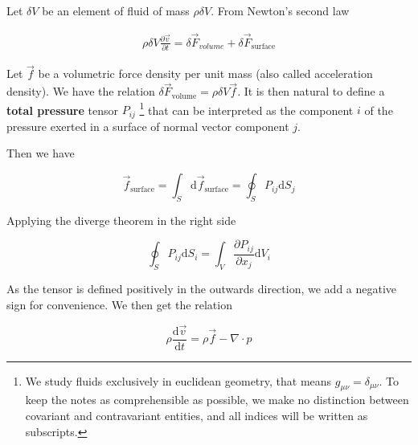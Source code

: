 \documentclass{article}
\begin{document}
Let $\delta V$ be an element of fluid of mass $\rho \delta V$. From Newton's
second law

\begin{eqnarray*}
  \rho \delta V \frac{\partial \vec{v}}{\partial t}=\delta \vec{F}_{v o l u m e}+\delta \vec{F}_{\text {surface}} 
\end{eqnarray*}

Let $\vec{f}$ be a volumetric force density per unit mass (also called
acceleration density). We have the relation $\delta \vec{F}_{\text{volume}} =
\rho \delta V \vec{f}$. It is then natural to define a \textbf{total pressure}
tensor $P_{ij}$ \footnote{We study fluids exclusively in euclidean geometry,
  that means $g_{\mu \nu} = \delta_{\mu \nu}$. To keep the notes as
  comprehensible as possible, we make no distinction between covariant and
  contravariant entities, and all indices will be written as subscripts.} that can be interpreted as the component $i$ of the pressure
exerted in a surface of normal vector component $j$.

\begin{center}
\end{center}

Then we have

\begin{equation*}
  \vec{f}_{\text {surface}}=\int_{S} \mathrm{d} \vec{f}_{\text {surface}}=\oint_{S} P_{i j} \mathrm{d} S_{j}
\end{equation*}

Applying the diverge theorem in the right side

\begin{equation*}
  \oint_{S} P_{i j} \mathrm{d} S_{i}=\int_{V} \frac{\partial P_{i j}}{\partial x_{j}} \mathrm{d} V_{i}
\end{equation*}

As the tensor is defined positively in the outwards direction, we add a negative
sign for convenience. We then get the relation

\begin{equation}
  \label{eq:euler}
  \rho \frac{\mathrm{d} \vec{v}}{\mathrm{d} t}=\rho \vec{f}-\nabla \cdot p
\end{equation}
\end{document}
